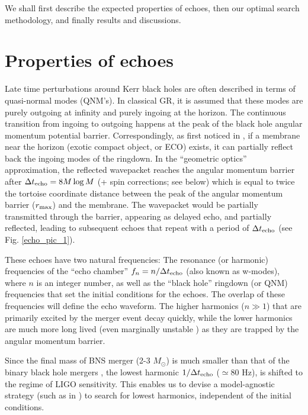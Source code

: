 \documentclass[12pt]{article}
\begin{document}
We shall first describe the expected properties of echoes, then our optimal search methodology, and finally results and discussions.




\section{Properties of echoes}\label{echo_prop}
Late time perturbations around Kerr black holes are often described in terms of  quasi-normal modes (QNM's). 
In classical GR, it is assumed that these modes are purely outgoing at infinity and purely ingoing  at the horizon. The continuous transition from ingoing to outgoing happens at the peak of the black hole angular momentum potential barrier. Correspondingly, as first noticed in \cite{Cardoso:2016rao,Cardoso:2016oxy}, if a membrane near the horizon (exotic compact object, or ECO) exists, it can partially reflect back the ingoing modes of the ringdown. In the ``geometric optics'' approximation, the reflected wavepacket reaches the angular momentum barrier after $\Delta t_{\rm echo}=8M\log M$ (+ spin corrections; see below) which is equal to twice the tortoise coordinate distance between the peak of the angular momentum  barrier ($r_{\rm max}$) and the membrane. The wavepacket would be partially transmitted through the barrier, appearing as delayed echo, and partially reflected, leading to subsequent echoes that repeat with a period of $\Delta t_{\rm echo}$ (see Fig. \ref{echo_pic_1}). 

These echoes have two natural frequencies: The resonance (or harmonic) frequencies of the ``echo chamber'' $f_{n} = n/\Delta t_{\rm echo}$ (also known as w-modes), where $n$ is an integer number, as well as the ``black hole'' ringdown (or QNM) frequencies that set the initial conditions for the echoes. The overlap of these frequencies will define the echo waveform. The higher harmonics ($n\gg 1$) that are primarily excited by the merger event decay quickly, while the lower harmonics are much more long lived (even marginally unstable \cite{Maggio:2017ivp,Bueno:2017hyj,Wang:2018gin}) as they are trapped by the angular momentum barrier. %

Since the final mass of BNS merger (2-3 $M_{\odot}$) is much smaller than that of the binary black hole mergers \cite{Abedi:2016hgu}, the lowest harmonic $ 1/\Delta t_{\rm echo}$ ($\simeq 80$ Hz), is shifted to the regime of LIGO sensitivity. This enables us to devise a model-agnostic strategy (such as in \cite{Conklin:2017lwb}) to search for lowest harmonics, independent of the initial conditions. %
\end{document}
